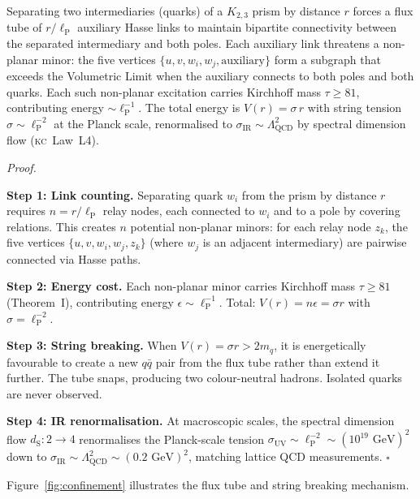 \documentclass[11pt, a4paper, openany]{book}
\newcommand{\lP}{\ell_{\mathrm{P}}}
\newcommand{\dS}{d_{\mathrm{S}}}
\newcommand{\KC}[1]{\textnormal{(\textsc{kc}~#1)}}
\newcounter{thm}[chapter]
\renewenvironment{proof}[1][Proof]{%
  \par\noindent\textit{#1.}\quad
}{\hfill$\square$\par\medskip}
\begin{document}
\begin{theorem}\label{thm:confinement}
Separating two intermediaries (quarks) of a $K_{2,3}$ prism by
distance $r$ forces a flux tube of $r/\lP$ auxiliary Hasse links to
maintain bipartite connectivity between the separated intermediary and
both poles.  Each auxiliary link threatens a non-planar minor: the five
vertices $\{u, v, w_i, w_j, \text{auxiliary}\}$ form a subgraph that
exceeds the Volumetric Limit when the auxiliary connects to both poles
and both quarks.  Each such non-planar excitation carries Kirchhoff
mass $\tau \geq 81$, contributing energy $\sim \lP^{-1}$. The total energy is $V(r) = \sigma\,r$ with string
tension $\sigma \sim \lP^{-2}$ at the Planck scale, renormalised to
$\sigma_{\mathrm{IR}} \sim \Lambda_{\mathrm{QCD}}^2$ by spectral
dimension flow \KC{Law~L4}.
\end{theorem}

\begin{proof}
\textbf{Step 1: Link counting.} Separating quark $w_i$ from the
prism by distance $r$ requires $n = r/\lP$ relay nodes, each
connected to $w_i$ and to a pole by covering relations. This creates
$n$ potential non-planar minors: for each relay node $z_k$, the five
vertices $\{u, v, w_i, w_j, z_k\}$ (where $w_j$ is an adjacent
intermediary) are pairwise connected via Hasse paths.

\textbf{Step 2: Energy cost.} Each non-planar minor carries Kirchhoff
mass $\tau \geq 81$ (Theorem~I), contributing energy
$\epsilon \sim \lP^{-1}$. Total: $V(r) = n\epsilon = \sigma r$
with $\sigma = \lP^{-2}$.

\textbf{Step 3: String breaking.} When $V(r) = \sigma r > 2m_q$,
it is energetically favourable to create a new $q\bar{q}$ pair from
the flux tube rather than extend it further. The tube snaps, producing
two colour-neutral hadrons. Isolated quarks are never observed.

\textbf{Step 4: IR renormalisation.} At macroscopic scales, the
spectral dimension flow $\dS: 2 \to 4$ renormalises the Planck-scale
tension $\sigma_{\mathrm{UV}} \sim \lP^{-2} \sim (10^{19}\text{ GeV})^2$
down to $\sigma_{\mathrm{IR}} \sim \Lambda_{\mathrm{QCD}}^2 \sim
(0.2\text{ GeV})^2$, matching lattice QCD measurements.
\end{proof}

\noindent
Figure~\ref{fig:confinement} illustrates the flux tube and string
breaking mechanism.
\end{document}
